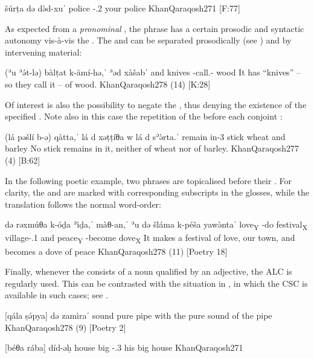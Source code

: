 {šúrṭa də\cb{}  də̀d-xuˈ}
{police \lnk\cb{}  \lnk-\poss.2\pl{}}
{your police}
{KhanQaraqosh}{271 {[F:77]}}


As expected from a \textit{pronominal} \lnk*, the \lnk* phrase has a certain prosodic and syntactic autonomy vis-à-vis the \prim. The \prim and \secn  can be separated prosodically  (see ) and  by intervening material: 

{(ʾu\cb{}  ʾə́t-lə) bàlṭat k-ămí-hə,ˈ ʾəd\cb{}  xàšabˈ}
{and\cb{}  \masc{} knives \ind-call.\pl-\masc{} \lnk\cb{}  wood}
{It has \enquote{knives} -- so they call it -- of wood.}
{KhanQaraqosh}{278 (14) {[K:28]}}

Of interest is also the possibility to negate the \lnk*, thus denying the existence of the specified \prim. Note also in this case the repetition of the \lnk* before each conjoint \secn: 

{(lá pəšlí\cb{} b-ə) qàtta,ˈ lá d\cb{} xəṭṭíθa\cb{} w lá d\cb{} sʾə̀rta.ˈ}
{\neg{} remain\cb{} in-3\masc{} stick \neg{} \lnk\cb{} wheat\cb{} and \neg{} \lnk\cb{} barley}
{No stick remains in it, neither of wheat nor of barley.}
{KhanQaraqosh}{277 (4) {[B:62]}}

In the following poetic example, two \lnk* phrases are topicalised before their \prims. For clarity, the \secns and \prims are marked with corresponding subscripts in the glosses, while the translation follows the normal  word-order:

{də\cb{} rəxmúθa k-óḏa ʾìḏa,ˈ màθ-an,ˈ ʾu\cb{} də\cb{} šláma k-péša yawə̀ntaˈ}
{\lnk\cb{} love\textsubscript{Y} \ind-do festival\textsubscript{X} village-\poss.1\pl{} and\cb{} \lnk\cb{} peace\textsubscript{Y} \ind-become dove\textsubscript{X}}
{It makes a festival of love, our town, and becomes a dove of peace}
{KhanQaraqosh}{278 (11) {[Poetry 18]}}

Finally, whenever the \prim consists of a noun qualified by an adjective, the ALC is regularly used. This can be contrasted with the situation in \JZax, in which the CSC is available in such cases; see .





{[qála ṣə́pya] də\cb{} zamìraˈ}
{sound pure \lnk\cb{} pipe}
{with the pure sound of the pipe}
{KhanQaraqosh}{278 (9) {[Poetry 2]}}

{[béθa rába] díd-əḥ}
{house big \lnk-\poss.3\masc}
{his big house}
{KhanQaraqosh}{271}

